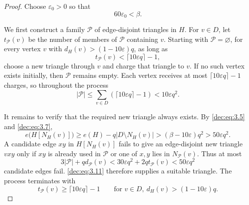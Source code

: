 \documentclass[11pt]{article}
\numberwithin{equation}{section}
\theoremstyle{remark}
\newcommand{\e}{\varepsilon}
\begin{document}
\begin{proof}
Choose \(\e_0>0\) so that
\begin{equation}\label{dec:eq:3.7}
 60\e_0<\beta.
\end{equation}

We first construct a family \(\mathcal P\) of edge-disjoint triangles in
\(H\).  For \(v\in D\), let \(t_{\mathcal P}(v)\) be the number of members
of \(\mathcal P\) containing \(v\).  Starting with
\(\mathcal P=\varnothing\), for every vertex \(v\) with \(d_H(v)>(1-10\e) q\), as long as
\begin{equation*}
t_{\mathcal P}(v)<\lceil10\e q\rceil-1,
\end{equation*}
choose a new triangle through \(v\) and charge
that triangle to \(v\). If no such vertex exists initially, then \(\mathcal P\) remains empty.
Each vertex receives at most \(\lceil10\e q\rceil-1\) charges, so
throughout the process
\begin{equation*}
 |\mathcal P|\le\sum_{v\in D}(\lceil10\e q\rceil-1)<10\e q^2.
\end{equation*}

It remains to verify that the required new triangle always exists.
By \eqref{dec:eq:3.5} and \eqref{dec:eq:3.7},
\begin{equation}\label{dec:eq:3.11}
 e\bigl(H[N_H(v)]\bigr)
 \ge e(H)-q|D\setminus N_H(v)|
 >\left(\beta-10\e\right)q^2
 >50\e q^2.
\end{equation}
A candidate edge \(xy\) in \(H[N_H(v)]\) fails to give an edge-disjoint
new triangle \(vxy\) only if \(xy\) is already used in \(\mathcal P\) or one of \(x,y\) lies in
\(N_{\mathcal P}(v)\).  Thus at most
\begin{equation*}
 3|\mathcal P|+q d_{\mathcal P}(v)<30\e q^2+2qt_{\mathcal P}(v)<50\e q^2
\end{equation*}
candidate edges fail. \eqref{dec:eq:3.11} therefore supplies a suitable
triangle.  The process terminates with
\begin{equation}\label{dec:eq:3.12}
 t_{\mathcal P}(v)\ge \lceil10\e q\rceil-1\qquad \text{for\ }v\in D,\ d_H(v)>(1-10\e) q.
\end{equation}


\end{proof}
\end{document}
